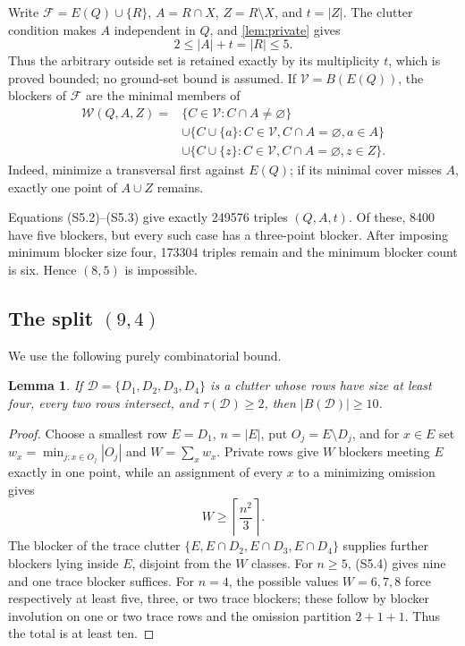 \documentclass[11pt,a4paper]{article}
\newtheorem{lemma}[theorem]{Lemma}
\theoremstyle{definition}
\newcommand{\blocker}{B}
\begin{document}
Write $\mathcal F=E(Q)\cup\{R\}$,
$A=R\cap X$, $Z=R\setminus X$, and $t=|Z|$.  The clutter condition makes
$A$ independent in $Q$, and \cref{lem:private} gives
\[
 2\leq|A|+t=|R|\leq5.                   \tag{S5.2}
\]
Thus the arbitrary outside set is retained exactly by its multiplicity $t$,
which is proved bounded; no ground-set bound is assumed.  If
$\mathcal V=\blocker(E(Q))$, the blockers of $\mathcal F$ are the minimal
members of
\[
\begin{split}
 \mathcal W(Q,A,Z)={}&\{C\in\mathcal V:C\cap A\ne\varnothing\}\\
 &\cup\{C\cup\{a\}:C\in\mathcal V, C\cap A=\varnothing, a\in A\}\\
 &\cup\{C\cup\{z\}:C\in\mathcal V, C\cap A=\varnothing, z\in Z\}.
\end{split}                                                  \tag{S5.3}
\]
Indeed, minimize a transversal first against $E(Q)$; if its minimal cover
misses $A$, exactly one point of $A\cup Z$ remains.

Equations (S5.2)--(S5.3) give exactly 249576 triples $(Q,A,t)$.  Of these,
8400 have five blockers, but every such case has a three-point blocker.
After imposing minimum blocker size four, 173304 triples remain and the
minimum blocker count is six.  Hence $(8,5)$ is impossible.

\subsection{The split \texorpdfstring{$(9,4)$}{(9,4)}}

We use the following purely combinatorial bound.

\begin{lemma}
\label{lem:four-ten}
If $\mathcal D=\{D_1,D_2,D_3,D_4\}$ is a clutter whose rows have size at
least four, every two rows intersect, and $\tau(\mathcal D)\geq2$, then
$|\blocker(\mathcal D)|\geq10$.
\end{lemma}

\begin{proof}
Choose a smallest row $E=D_1$, $n=|E|$, put
$O_j=E\setminus D_j$, and for $x\in E$ set
$w_x=\min_{j:x\in O_j}|O_j|$ and $W=\sum_xw_x$.  Private rows give $W$
blockers meeting $E$ exactly in one point, while an assignment of every
$x$ to a minimizing omission gives
\[
 W\geq\left\lceil\frac{n^2}{3}\right\rceil.               \tag{S5.4}
\]
The blocker of the trace clutter
$\{E,E\cap D_2,E\cap D_3,E\cap D_4\}$ supplies further blockers lying
inside $E$, disjoint from the $W$ classes.  For $n\geq5$, (S5.4) gives nine
and one trace blocker suffices.  For $n=4$, the possible values
$W=6,7,8$ force respectively at least five, three, or two trace blockers;
these follow by blocker involution on one or two trace rows and the omission
partition $2+1+1$.  Thus the total is at least ten.
\end{proof}
\end{document}
